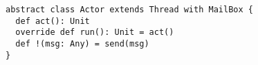 
\begin{lstlisting}
abstract class Actor extends Thread with MailBox {
  def act(): Unit
  override def run(): Unit = act()
  def !(msg: Any) = send(msg)
}
\end{lstlisting}

